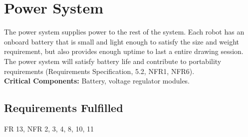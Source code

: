 
\section{Power System}
\label{sec:power_system}
The power system supplies power to the rest of the system. Each robot has an onboard battery that is small and light enough to satisfy the size and weight requirement, but also provides enough uptime to last a entire drawing session. The power system will satisfy battery life and contribute to portability requirements (Requirements Specification, 5.2, NFR1, NFR6). \\

\noindent
\textbf{Critical Components:} Battery, voltage regulator modules. 

\subsection{Requirements Fulfilled}
FR 13, 
NFR 2, 3, 4, 8, 10, 11